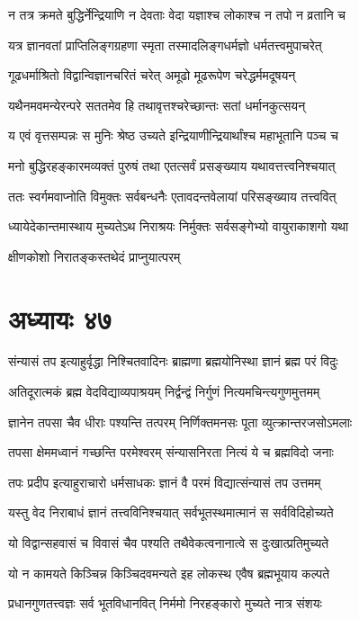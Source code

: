 \twolineshloka
{न तत्र क्रमते बुद्धिर्नेन्द्रियाणि न देवताः}
{वेदा यज्ञाश्च लोकाश्च न तपो न व्रतानि च}


\twolineshloka
{यत्र ज्ञानवतां प्राप्तिलिङ्गग्रहणा स्मृता}
{तस्मादलिङ्गधर्मज्ञो धर्मतत्त्वमुपाचरेत्}


\twolineshloka
{गूढधर्माश्रितो विद्वान्विज्ञानचरितं चरेत्}
{अमूढो मूढरूपेण चरेद्धर्ममदूषयन्}


\twolineshloka
{यथैनमवमन्येरन्परे सततमेव हि}
{तथावृत्तश्चरेच्छान्तः सतां धर्मानकुत्सयन्}


\twolineshloka
{य एवं वृत्तसम्पन्नः स मुनिः श्रेष्ठ उच्यते}
{इन्द्रियाणीन्द्रियार्थांश्च महाभूतानि पञ्च च}


\twolineshloka
{मनो बुद्धिरहङ्कारमव्यक्तं पुरुषं तथा}
{एतत्सर्वं प्रसङ्ख्याय यथावत्तत्त्वनिश्चयात्}


\twolineshloka
{ततः स्वर्गमवाप्नोति विमुक्तः सर्वबन्धनैः}
{एतावदन्तवेलायां परिसङ्ख्याय तत्त्ववित्}


\twolineshloka
{ध्यायेदेकान्तमास्थाय मुच्यतेऽथ निराश्रयः}
{निर्मुक्तः सर्वसङ्गेभ्यो वायुराकाशगो यथा}


क्षीणकोशो निरातङ्कस्तथेदं प्राप्नुयात्परम्
\chapter{अध्यायः ४७}
\twolineshloka
{संन्यासं तप इत्याहुर्वृद्धा निश्चितवादिनः}
{ब्राह्मणा ब्रह्मयोनिस्था ज्ञानं ब्रह्म परं विदुः}


\twolineshloka
{अतिदूरात्मकं ब्रह्म वेदविद्याव्यपाश्रयम्}
{निर्द्वन्द्वं निर्गुणं नित्यमचिन्त्यगुणमुत्तमम्}


\twolineshloka
{ज्ञानेन तपसा चैव धीराः पश्यन्ति तत्परम्}
{निर्णिक्तमनसः पूता व्युत्क्रान्तरजसोऽमलाः}


\twolineshloka
{तपसा क्षेममध्वानं गच्छन्ति परमेश्वरम्}
{संन्यासनिरता नित्यं ये च ब्रह्मविदो जनाः}


\twolineshloka
{तपः प्रदीप इत्याहुराचारो धर्मसाधकः}
{ज्ञानं वै परमं विद्यात्संन्यासं तप उत्तमम्}


\twolineshloka
{यस्तु वेद निराबाधं ज्ञानं तत्त्वविनिश्चयात्}
{सर्वभूतस्थमात्मानं स सर्वविदिहोच्यते}


\twolineshloka
{यो विद्वान्सहवासं च विवासं चैव पश्यति}
{तथैवेकत्वनानात्वे स दुःखात्प्रतिमुच्यते}


\twolineshloka
{यो न कामयते किञ्चिन्न किञ्चिदवमन्यते}
{इह लोकस्थ एवैष ब्रह्मभूयाय कल्पते}


\twolineshloka
{प्रधानगुणतत्त्वज्ञः सर्व भूतविधानवित्}
{निर्ममो निरहङ्कारो मुच्यते नात्र संशयः}


